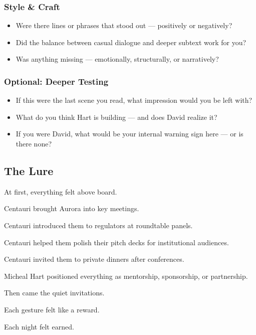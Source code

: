 \subsubsection{Style \& Craft}

\begin{itemize}
  \item Were there lines or phrases that stood out — positively or negatively?
  \item Did the balance between casual dialogue and deeper subtext work for you?
  \item Was anything missing — emotionally, structurally, or narratively?
\end{itemize}

\subsubsection{Optional: Deeper Testing}

\begin{itemize}
  \item If this were the last scene you read, what impression would you be left with?
  \item What do you think Hart is building — and does David realize it?
  \item If you were David, what would be your internal warning sign here — or is there none?
\end{itemize}






\subsection{The Lure}

At first, everything felt above board.

Centauri brought Aurora into key meetings.  

Centauri introduced them to regulators at roundtable panels.  

Centauri helped them polish their pitch decks for institutional audiences.  

Centauri invited them to private dinners after conferences.

Micheal Hart positioned everything as mentorship, sponsorship, or partnership.

Then came the quiet invitations.

Each gesture felt like a reward. 

Each night felt earned. 

